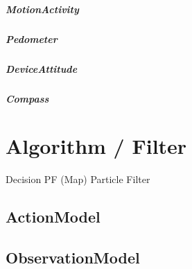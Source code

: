 \paragraph{MotionActivity}

\paragraph{Pedometer}

\paragraph{DeviceAttitude}

\paragraph{Compass}


\chapter{Algorithm / Filter}
Decision PF (Map)
Particle Filter
\section{ActionModel}
\section{ObservationModel}

